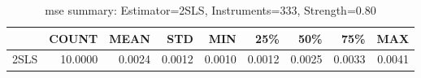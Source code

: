 \begin{table}[ht]
\centering
\caption{mse summary: Estimator=2SLS, Instruments=333, Strength=0.80}
\begin{tabular}{lrrrrrrrr}
\toprule
 & COUNT & MEAN & STD & MIN & 25\% & 50\% & 75\% & MAX \\
\midrule
2SLS & 10.0000 & 0.0024 & 0.0012 & 0.0010 & 0.0012 & 0.0025 & 0.0033 & 0.0041 \\
\bottomrule
\end{tabular}
\end{table}
